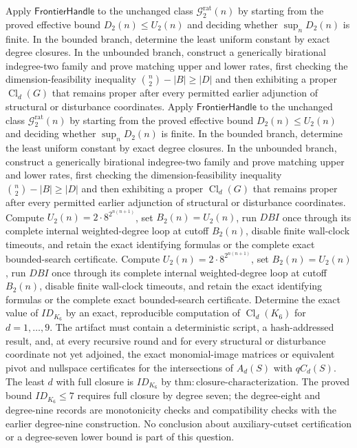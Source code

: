 Apply \(\mathsf{FrontierHandle}\) to the unchanged class \(\mathcal G_{2}^{\mathrm{rat}}(n)\) by starting from the proved effective bound \(D_2(n)\leq U_2(n)\) and deciding whether \(\sup_nD_2(n)\) is finite.  In the bounded branch, determine the least uniform constant by exact degree closures.  In the unbounded branch, construct a generically birational indegree-two family and prove matching upper and lower rates, first checking the dimension-feasibility inequality \(\binom n2-|B|\geq|D|\) and then exhibiting a proper \(\operatorname{Cl}_d(G)\) that remains proper after every permitted earlier adjunction of structural or disturbance coordinates.
Apply \(\mathsf{FrontierHandle}\) to the unchanged class \(\mathcal G_{2}^{\mathrm{rat}}(n)\) by starting from the proved effective bound \(D_2(n)\leq U_2(n)\) and deciding whether \(\sup_nD_2(n)\) is finite.  In the bounded branch, determine the least uniform constant by exact degree closures.  In the unbounded branch, construct a generically birational indegree-two family and prove matching upper and lower rates, first checking the dimension-feasibility inequality \(\binom n2-|B|\geq|D|\) and then exhibiting a proper \(\operatorname{Cl}_d(G)\) that remains proper after every permitted earlier adjunction of structural or disturbance coordinates.
Compute \(U_2(n)=2\cdot8^{2^{n(n+1)}}\), set \(B_2(n)=U_2(n)\), run \(DBI\) once through its complete internal weighted-degree loop at cutoff \(B_2(n)\), disable finite wall-clock timeouts, and retain the exact identifying formulas or the complete exact bounded-search certificate.
Compute \(U_2(n)=2\cdot8^{2^{n(n+1)}}\), set \(B_2(n)=U_2(n)\), run \(DBI\) once through its complete internal weighted-degree loop at cutoff \(B_2(n)\), disable finite wall-clock timeouts, and retain the exact identifying formulas or the complete exact bounded-search certificate.
Determine the exact value of \(ID_{K_6}\) by an exact, reproducible computation of \(\operatorname{Cl}_d(K_6)\) for \(d=1,\ldots,9\).  The artifact must contain a deterministic script, a hash-addressed result, and, at every recursive round and for every structural or disturbance coordinate not yet adjoined, the exact monomial-image matrices or equivalent pivot and nullspace certificates for the intersections of \(A_d(S)\) with \(qC_d(S)\).  The least \(d\) with full closure is \(ID_{K_6}\) by \(\mathrm{thm:closure\mbox{-}characterization}\).  The proved bound \(ID_{K_6}\leq7\) requires full closure by degree seven; the degree-eight and degree-nine records are monotonicity checks and compatibility checks with the earlier degree-nine construction.  No conclusion about auxiliary-cutset certification or a degree-seven lower bound is part of this question.
